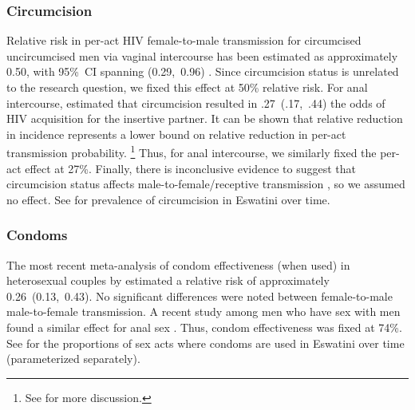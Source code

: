 \subsubsection{Circumcision}\label{mod.par.beta.circ}
Relative risk in per-act HIV female-to-male transmission for circumcised \vs uncircumcised men
via vaginal intercourse has been estimated as
approximately 0.50, with 95\%~CI spanning (0.29,~0.96) \cite{Boily2009,Hughes2012,Patel2014}.
Since circumcision status is unrelated to the research question,
we fixed this effect at 50\% relative risk.
For anal intercourse, \citet{Wiysonge2011} estimated that circumcision resulted in
.27~(.17,~.44) the odds of HIV acquisition for the insertive partner.
It can be shown that relative reduction in incidence represents a lower bound
on relative reduction in per-act transmission probability.%
\footnote{See  for more discussion.}
Thus, for anal intercourse, we similarly fixed the per-act effect at 27\%.
Finally, there is inconclusive evidence to suggest that circumcision status affects
male-to-female/receptive transmission \cite{Weiss2009,Wiysonge2011}, so we assumed no effect.
See  for prevalence of circumcision in Eswatini over time.
\subsubsection{Condoms}\label{mod.par.beta.condom}
The most recent meta-analysis of condom effectiveness (when used) in heterosexual couples
by \citet{Giannou2016} estimated a relative risk of approximately 0.26~(0.13,~0.43).
No significant differences were noted between female-to-male \vs male-to-female transmission.
A recent study among men who have sex with men found
a similar effect for anal sex \cite{Smith2015}.
Thus, condom effectiveness was fixed at 74\%.
See  for the proportions of sex acts where condoms are used
in Eswatini over time (parameterized separately).
